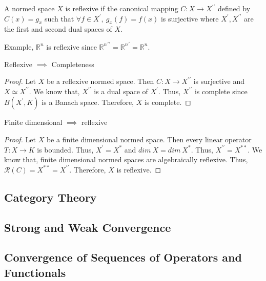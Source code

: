 \begin{definition}[Reflexive]
	A normed space $X$ is reflexive if the canonical mapping $C : X \to X^{\prime\prime}$ defined by $C(x) = g_x$ such that $\forall f \in X^\prime,\ g_x(f) = f(x)$ is surjective where $X^\prime, X^{\prime\prime}$ are the first and second dual spaces of $X$.
\end{definition}

Example, $\mathbb{R}^n$ is reflexive since ${\mathbb{R}^n}^{\prime\prime} = {\mathbb{R}^n}^\prime = \mathbb{R}^n$.

\begin{theorem}
	Reflexive $\implies$ Completeness
\end{theorem}
\begin{proof}
	Let $X$ be a reflexive normed space.
	Then $C : X \to X^{\prime\prime}$ is surjective and $X \simeq X^{\prime\prime}$.
	We know that, $X^{\prime\prime}$ is a dual space of $X^\prime$.
	Thus, $X^{\prime\prime}$ is complete since $B(X^\prime,K)$ is a Banach space.
	Therefore, $X$ is complete.
\end{proof}

\begin{theorem}
	Finite dimensional $\implies$ reflexive
\end{theorem}
\begin{proof}
	Let $X$ be a finite dimensional normed space.
	Then every linear operator $T : X \to K$ is bounded.
	Thus, $X^\prime = X^\ast$ and $dim\ X = dim\ X^\ast$.
	Thus, $X^{\prime\prime} = X^{\ast\ast}$.
	We know that, finite dimensional normed spaces are algebraically reflexive.
	Thus, $\mathscr{R}(C) = X^{\ast\ast} = X^{\prime\prime}$.
	Therefore, $X$ is reflexive.
\end{proof}
\subsection{Category Theory}
\subsection{Strong and Weak Convergence}
\subsection{Convergence of Sequences of Operators and Functionals}
\setcounter{subsection}{11}
